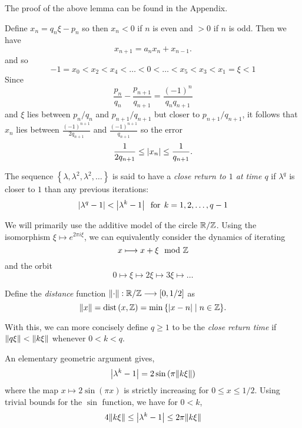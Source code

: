 \documentclass[../main.tex]{subfiles}
\begin{document}
The proof of the above lemma can be found in the Appendix.

Define $x_{n} = q_{n}\xi - p_{n}$ so then $x_{n} < 0$ if $n$ is even and $> 0$ if $n$ is odd. Then we have 
\[
x_{n+1} = a_{n}x_{n} + x_{n-1}.
\]
and so
\[
-1 = x_{0} < x_{2}< x_{4} < \dots < 0 < \dots < x_{5} < x_{3} < x_{1} = \xi < 1
\]
Since
\[
\frac{p_n}{q_n} - \frac{p_{n+1}}{q_{n+1}} = \frac{(-1)^n}{q_{n}q_{n+1}}
\]
and $\xi$ lies between $p_{n}/q_{n}$ and $p_{n+1}/q_{n+1}$ but closer to $p_{n+1}/q_{n+1}$, it follows that $x_{n}$ lies between $\frac{(-1)^{n+1}}{2q_{n+1}}$ and $\frac{(-1)^{n+1}}{q_{n+1}}$ so the error
\begin{equation}\label{error bound}
    \frac{1}{2q_{n+1}} \leq \left|x_{n}\right| \leq \frac{1}{q_{n+1}}.
\end{equation}

\begin{dfn}
The sequence $\left\{\lambda, \lambda^2, \lambda^2, \dots \right\}$ is said to have a \textit{close return to $1$ at time $q$} if $\lambda^q$ is closer to $1$ than any previous iterations:
\[
\left|\lambda^q - 1\right| < \left|\lambda^k - 1\right|\;\; \text{for} \;\, k = 1, 2, \dots, q-1
\]
\end{dfn}

We will primarily use the additive model of the circle $\mathbb{R}/\mathbb{Z}$. Using the isomorphism $\xi \longmapsto e^{2\pi i \xi}$, we can equivalently consider the dynamics of iterating 
\[
x \longmapsto x + \xi \mod{\mathbb{Z}}
\]
and the orbit
\[
0 \longmapsto \xi \longmapsto 2\xi \longmapsto 3\xi \longmapsto \dots
\]

\begin{dfn}
Define the \textit{distance} function $\|{\cdot}\| : \mathbb{R}/\mathbb{Z} \longrightarrow [0,1/2]$ as 
\[
\|{x}\| = \text{dist}\left(x, \mathbb{Z} \right) = \min{\left\{\ensuremath{\left|x - n\right|} \mid n \in \ensuremath{\mathbb{Z}}\right\}}.
\]
\end{dfn}

With this, we can more concisely define $q \geq 1$ to be the \textit{close return time} if $\|{q\xi}\| < \|{k\xi}\|$ whenever $0 < k < q$.

An elementary geometric argument gives,
\[
\left|\lambda^k - 1\right| = 2\sin{(\pi \ensuremath{\|{k\xi}}\|)}
\]
where the map $x \longmapsto 2\sin{(\pi x)}$ is strictly increasing for $0 \leq x \leq 1/2$. Using trivial bounds for the $\sin$ function, we have for $0 < k$,
\begin{equation}\label{lamdist}
  4\|{k\xi}\| \leq \left|\lambda^{k} - 1\right| \leq 2\pi \|{k\xi}\|  
\end{equation}
\end{document}
